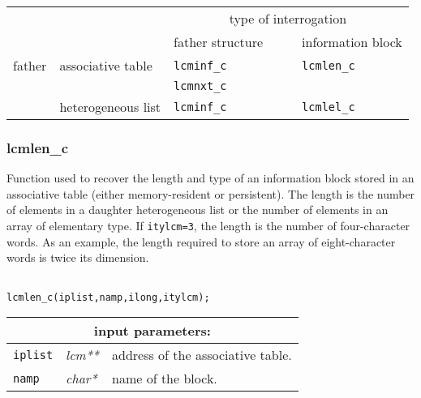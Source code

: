 \vskip 0.4cm

\begin{center}
\begin{tabular}{|c|l|l|l|}
\cline{3-4}
\multicolumn{2}{c|}{} & \multicolumn{2}{c|}{type of interrogation} \\
\cline{3-4}
\multicolumn{2}{c|}{} & father structure~~~~ & information block \\
\hline
father & associative table & {\tt lcminf\_c} & {\tt lcmlen\_c} \\
       &                   & {\tt lcmnxt\_c} &              \\
\cline{2-4}
       & heterogeneous list  & {\tt lcminf\_c} & {\tt lcmlel\_c} \\
\hline
\end{tabular}
\end{center}

\subsubsection{lcmlen\_c}

Function used to recover the length and type of an information block stored in an
associative table (either memory-resident or persistent). The length is the number of
elements in a daughter heterogeneous list or the number of elements in an array of elementary type.
If {\tt itylcm=3}, the length is the number of four-character words. As an example, the length required
to store an array of eight-character words is twice its dimension.

\begin{verbatim}

lcmlen_c(iplist,namp,ilong,itylcm);
\end{verbatim}

\noindent
\begin{tabular}{|p{1.5cm}|p{2cm}|p{11cm}|}
\hline
\multicolumn{3}{|c|}{\bf input parameters:} \\
\hline
{\tt iplist} & {\it lcm**} & address of the associative table. \\
\hline
{\tt namp} & {\it char*} & name of the block. \\
\hline
\end{tabular}

\vskip 0.8cm

